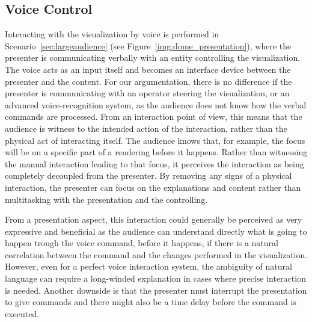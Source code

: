 \documentclass[journal]{vgtc}                %
\newcommand{\todo}[1]{\textbf{\textcolor{red}{[TODO: {#1}]}}}
\begin{document}

\subsection{Voice Control}

Interacting with the visualization by voice is performed in Scenario~\ref{sec:largeaudience} (see Figure~\ref{img:dome_presentation}), where the presenter is communicating verbally with an entity controlling the visualization.
The voice acts as an input itself and becomes an interface device between the presenter and the content.
For our argumentation, there is no difference if the presenter is communicating with an operator steering the visualization, or an advanced voice-recognition system, as the audience does not know how the verbal commands are processed.
%
From an interaction point of view, this means that the audience is witness to the intended action of the interaction, rather than the physical act of interacting itself.
The audience knows that, for example, the focus will be on a specific part of a rendering before it happens.
Rather than witnessing the manual interaction leading to that focus, it perceives the interaction as being completely decoupled from the presenter.
By removing any signs of a physical interaction, the presenter can focus on the explanations and content rather than multitasking with the presentation and the controlling.

From a presentation aspect, this interaction could generally be perceived as very expressive and beneficial as the audience can understand directly what is going to happen trough the voice command, before it happens, if there is a natural correlation between the command and the changes performed in the visualization.
However, even for a perfect voice interaction system, the ambiguity of natural language can require a long-winded explanation in cases where precise interaction is needed. Another downside is that the presenter must interrupt the presentation to give commands and there might also be a time delay before the command is executed.
\end{document}
